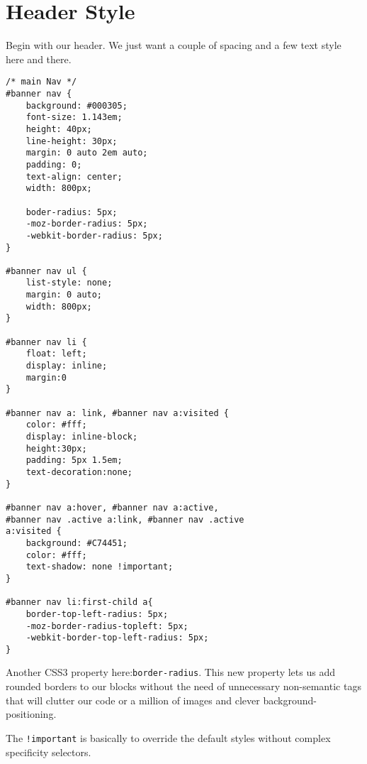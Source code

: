 \documentclass[a4paper, 12pt]{book}
\begin{document}
\section{Header Style}
Begin with our header. We just want a couple of spacing and a few text style
here and there.
\begin{verbatim}
/* main Nav */
#banner nav {
    background: #000305;
    font-size: 1.143em;
    height: 40px;
    line-height: 30px;
    margin: 0 auto 2em auto;
    padding: 0;
    text-align: center;
    width: 800px;

    boder-radius: 5px;
    -moz-border-radius: 5px;
    -webkit-border-radius: 5px;
}

#banner nav ul {
    list-style: none;
    margin: 0 auto;
    width: 800px;
}

#banner nav li {
    float: left;
    display: inline;
    margin:0
}

#banner nav a: link, #banner nav a:visited {
    color: #fff;
    display: inline-block;
    height:30px;
    padding: 5px 1.5em;
    text-decoration:none;
}

#banner nav a:hover, #banner nav a:active,
#banner nav .active a:link, #banner nav .active
a:visited {
    background: #C74451;
    color: #fff;
    text-shadow: none !important;
}

#banner nav li:first-child a{
    border-top-left-radius: 5px;
    -moz-border-radius-topleft: 5px;
    -webkit-border-top-left-radius: 5px;
}
\end{verbatim}

Another CSS3 property here:\verb|border-radius|. This new property lets us add
rounded borders to our blocks without the need of unnecessary non-semantic tags
that will clutter our code or a million of images and clever
background-positioning.

The \verb|!important| is basically to override the default styles without
complex specificity selectors.
\end{document}

